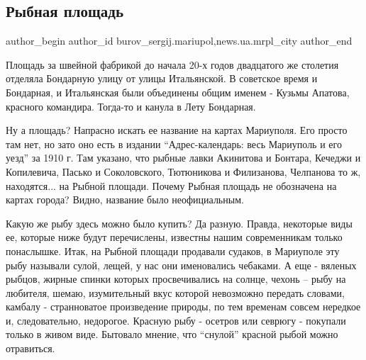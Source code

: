  
 
 
 
 
 
\subsection{Рыбная площадь}
\label{sec:17_12_2016.stz.news.ua.mrpl_city.1.rybnaja_ploschad}
 
\ifcmt
 author_begin
   author_id burov_sergij.mariupol,news.ua.mrpl_city
 author_end
\fi

Площадь за швейной фабрикой до начала 20-х годов двадцатого же столетия
отделяла Бондарную улицу от улицы Итальянской. В советское время и Бондарная, и
Итальянская были объединены общим именем - Кузьмы Апатова, красного командира.
Тогда-то и канула в Лету Бондарная.


Ну а площадь? Напрасно искать ее название на картах Мариуполя. Его просто там
нет, но зато  оно есть в издании \enquote{Адрес-календарь: весь Мариуполь и его уезд}
за 1910 г. Там указано, что рыбные лавки Акинитова и Бонтара, Кечеджи и
Копилевича, Пасько и Соколовского, Тютюникова и Филизанова, Челпанова то ж,
находятся... на Рыбной площади. Почему Рыбная площадь не обозначена на картах
города? Видно, название было неофициальным.

Какую же рыбу здесь можно было купить? Да разную. Правда, некоторые виды ее,
которые ниже будут перечислены, известны нашим современникам только понаслышке.
Итак, на Рыбной площади продавали судаков, в Мариуполе эту рыбу называли сулой,
лещей, у нас они именовались чебаками. А еще - вяленых рыбцов, жирные спинки
которых просвечивались на солнце, чехонь – рыбу на любителя, шемаю,
изумительный вкус которой невозможно передать словами, камбалу -  странноватое
произведение природы, по тем временам совсем нередкое и, следовательно,
недорогое. Красную рыбу - осетров или севрюгу - покупали  только в живом виде.
Бытовало мнение, что \enquote{снулой} красной рыбой можно отравиться.

